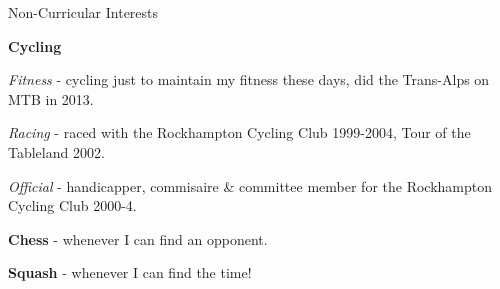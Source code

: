 \documentclass[a4paper,10pt]{article}
\begin{document}
\begin{cvsection}{Non-Curricular Interests}
  \raggedright
  \vspace{-0.5em}
  \begin{djs_itemize}
    \item \textbf{Cycling}
    \begin{djs_itemize}
      \item \textit{Fitness} - cycling just to maintain my fitness these days, did the Trans-Alps on MTB in 2013.
      \item \textit{Racing} - raced with the Rockhampton Cycling Club 1999-2004, Tour of the Tableland 2002.
      \item \textit{Official} - handicapper, commisaire \& committee member for the Rockhampton Cycling Club 2000-4.
    \end{djs_itemize}
    \item \textbf{Chess} - whenever I can find an opponent.
    \item \textbf{Squash} - whenever I can find the time!
  \end{djs_itemize}
\end{cvsection}
\end{document}
